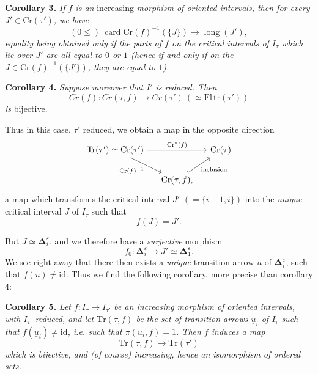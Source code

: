\documentclass[11pt]{article}
\newcommand{\printedpage}[1]{\marginpar{\footnotesize p.~#1}}
\newcommand{\msp}[1]{\marginpar{\footnotesize [#1]}}
\newcommand{\Tr}{\mathrm{Tr}}
\newcommand{\Cr}{\mathrm{Cr}}
\newcommand{\lng}{\operatorname{long}}
\newcommand{\card}{\operatorname{card}}
\newcommand{\bD}{\boldsymbol{\Delta}}
\begin{document}
\printedpage{24}

\textbf{Corollary 3.} \textit{If $f$ is an} increasing \textit{morphism of oriented intervals, then for every $J' \in \Cr(\tau')$, we have}
\[
(0 \leq)\ \card \Cr(f)^{-1}(\{J\}) \longrightarrow \lng(J'),
\] %
\msp{page 37}
\textit{equality being obtained only if the parts of $f$ on the critical intervals of $I_\tau$ which lie over $J'$ are all equal to $0$ or $1$ (hence if and only if on the $J \in \Cr(f)^{-1}(\{J'\})$, they are equal to $1$).}

\textbf{Corollary 4.} \textit{Suppose moreover that $I'$} \textit{is reduced. Then}
\[
\mathit{Cr}(f) : \mathit{Cr}(\tau, f) \longrightarrow \mathit{Cr}(\tau')\ (\simeq \mathrm{Fl}\,\mathrm{tr}(\tau'))
\]
\textit{is} bijective.

Thus in this case, $\tau'$ reduced, we obtain a map in the opposite direction
\[
\begin{tikzcd}[column sep=small]
\Tr(\tau') \simeq \Cr(\tau') \arrow[rr, "\Cr^*(f)"] \arrow[dr, "\Cr(f)^{-1}"'] & & \Cr(\tau) \\
 & \Cr(\tau, f), \arrow[ur, hook, "\text{inclusion}"'] &
\end{tikzcd}
\]
a map which transforms the critical interval $J'$ $(= \{i - 1, i\})$ into the \textit{unique} critical interval $J$ of $I_\tau$ such that
\[
f(J) = J'.
\]

\msp{page 38}
But $J \simeq \bD_i^{\varepsilon}$, and we therefore have a \textit{surjective} morphism
\[
f_0 : \bD_i^{\varepsilon} \longrightarrow J' \simeq \bD_1^{\varepsilon}.
\]
We see right away that there then exists a \textit{unique} transition arrow $u$ of $\bD_i^{\varepsilon}$, such that $f(u) \neq \mathrm{id}$. Thus we find the following corollary, more precise than corollary 4:

\textbf{Corollary 5.} \textit{Let $f : I_\tau \longrightarrow I_{\tau'}$ be an increasing morphism of oriented intervals, with $I_{\tau'}$ reduced, and let $\Tr(\tau, f)$ be the set of transition arrows $\underline{u}_i$ of $I_\tau$ such that $f(\underline{u}_i) \neq \mathrm{id}$, i.e. such that $\pi(u_i, f) = 1$. Then $f$ induces a map} %
\[
\Tr(\tau, f) \longrightarrow \Tr(\tau')
\]
\textit{which is bijective, and (of course) increasing, hence an isomorphism of ordered sets.}
\end{document}
